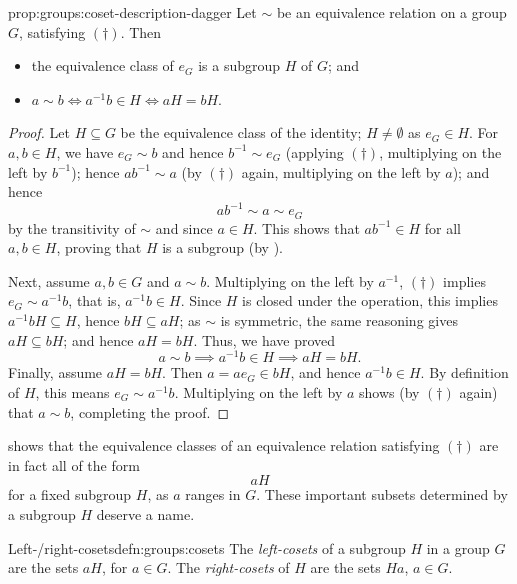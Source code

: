 \begin{prop}{}{prop:groups:coset-description-dagger}
  Let $\sim$ be an equivalence relation on a group $G$,
satisfying $(\dagger)$. Then
\begin{itemize}
\item the equivalence class of $e_G$ is a subgroup $H$ of $G$; and
\item $a \sim b \iff a^{-1}b \in H \iff aH = bH$.
\end{itemize}
\end{prop}
\begin{proof}
  Let $H \subseteq G$ be the equivalence class of the identity;
  $H \neq \emptyset$ as $e_G \in H$. For $a, b \in H$, we have
  $e_G \sim b$ and hence $b^{-1} \sim e_G$ (applying $(\dagger)$,
  multiplying on the left by $b^{-1}$); hence $ab^{-1} \sim a$ (by
  $(\dagger)$ again, multiplying on the left by $a$); and hence
  \[
    ab^{-1} \sim a \sim e_G
  \]
  by the transitivity of $\sim$ and since $a \in H$. This shows that
  $ab^{-1} \in H$ for all $a, b \in H$, proving that $H$ is a subgroup
  (by ).

  Next, assume $a, b \in G$ and $a \sim b$. Multiplying on the left by
  $a^{-1}$, $(\dagger)$ implies $e_G \sim a^{-1}b$, that is,
  $a^{-1}b \in H$. Since $H$ is closed under the operation, this
  implies $a^{-1}bH \subseteq H$, hence $bH \subseteq aH$; as $\sim$
  is symmetric, the same reasoning gives $aH \subseteq bH$; and hence
  $aH = bH$. Thus, we have proved
  \[
    a \sim b \implies a^{-1}b \in H \implies aH = bH.
  \]
  Finally, assume $aH = bH$. Then $a = ae_G \in bH$, and hence
  $a^{-1}b \in H$. By definition of $H$, this means
  $e_G \sim a^{-1}b$.  Multiplying on the left by $a$ shows (by
  $(\dagger)$ again) that $a \sim b$, completing the proof.
\end{proof}

 shows that the
equivalence classes of an equivalence relation satisfying $(\dagger)$
are in fact all of the form
\[
  aH
\]
for a fixed subgroup $H$, as $a$ ranges in $G$. These important
subsets determined by a subgroup $H$ deserve a name.

\begin{defn}{Left-/right-cosets}{defn:groups:cosets}
  The \emph{left-cosets} of a subgroup $H$ in a group $G$ are the sets
  $aH$, for $a \in G$. The \emph{right-cosets} of $H$ are the sets
  $Ha$, $a \in G$.
\end{defn}


